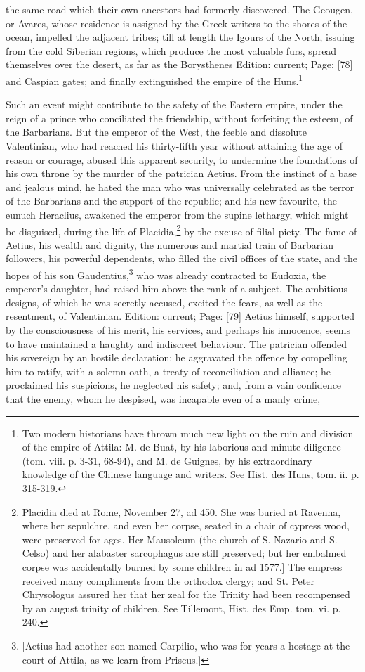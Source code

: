 the same road which their own ancestors had formerly discovered. The Geougen, or Avares, whose residence is assigned by the Greek writers to the shores of the ocean, impelled the adjacent tribes; till at length the Igours of the North, issuing from the cold Siberian regions, which produce the most valuable furs, spread themselves over the desert, as far as the Borysthenes Edition: current; Page: [78] and Caspian gates; and finally extinguished the empire of the Huns.\footnote{Two modern historians have thrown much new light on the ruin and division of the empire of Attila: M. de Buat, by his laborious and minute diligence (tom. viii. p. 3-31, 68-94), and M. de Guignes, by his extraordinary knowledge of the Chinese language and writers. See Hist. des Huns, tom. ii. p. 315-319.}

Such an event might contribute to the safety of the Eastern empire, under the reign of a prince who conciliated the friendship, without forfeiting the esteem, of the Barbarians. But the emperor of the West, the feeble and dissolute Valentinian, who had reached his thirty-fifth year without attaining the age of reason or courage, abused this apparent security, to undermine the foundations of his own throne by the murder of the patrician Aetius. From the instinct of a base and jealous mind, he hated the man who was universally celebrated as the terror of the Barbarians and the support of the republic; and his new favourite, the eunuch Heraclius, awakened the emperor from the supine lethargy, which might be disguised, during the life of Placidia,\footnote{Placidia died at Rome, November 27, ad 450. She was buried at Ravenna, where her sepulchre, and even her corpse, seated in a chair of cypress wood, were preserved for ages. Her Mausoleum (the church of S. Nazario and S. Celso) and her alabaster sarcophagus are still preserved; but her embalmed corpse was accidentally burned by some children in ad 1577.] The empress received many compliments from the orthodox clergy; and St. Peter Chrysologus assured her that her zeal for the Trinity had been recompensed by an august trinity of children. See Tillemont, Hist. des Emp. tom. vi. p. 240.} by the excuse of filial piety. The fame of Aetius, his wealth and dignity, the numerous and martial train of Barbarian followers, his powerful dependents, who filled the civil offices of the state, and the hopes of his son Gaudentius,\footnote{[Aetius had another son named Carpilio, who was for years a hostage at the court of Attila, as we learn from Priscus.]} who was already contracted to Eudoxia, the emperor\texthebrew{}’s daughter, had raised him above the rank of a subject. The ambitious designs, of which he was secretly accused, excited the fears, as well as the resentment, of Valentinian. Edition: current; Page: [79] Aetius himself, supported by the consciousness of his merit, his services, and perhaps his innocence, seems to have maintained a haughty and indiscreet behaviour. The patrician offended his sovereign by an hostile declaration; he aggravated the offence by compelling him to ratify, with a solemn oath, a treaty of reconciliation and alliance; he proclaimed his suspicions, he neglected his safety; and, from a vain confidence that the enemy, whom he despised, was incapable even of a manly crime, 